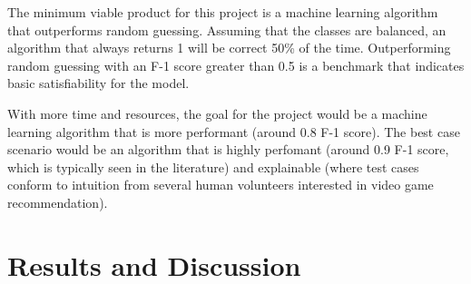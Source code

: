 \documentclass[10pt,twocolumn]{article}
\begin{document}
The minimum viable product for this project is a machine learning algorithm that outperforms random guessing. Assuming that the classes are balanced, an algorithm that always returns 1 will be correct 50\% of the time. Outperforming random guessing with an F-1 score greater than 0.5 is a benchmark that indicates basic satisfiability for the model.

With more time and resources, the goal for the project would be a machine learning algorithm that is more performant (around 0.8 F-1 score). The best case scenario would be an algorithm that is highly perfomant (around 0.9 F-1 score, which is typically seen in the literature) and explainable (where test cases conform to intuition from several human volunteers interested in video game recommendation).

\section{Results and Discussion}

\end{document}
